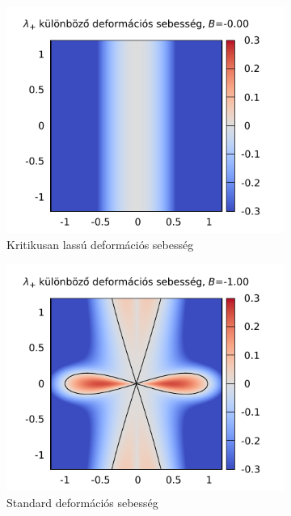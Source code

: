 \documentclass[10pt,a4paper]{scrartcl}
\begin{document}
\begin{figure}[htb]
\centering
\begin{subfigure}[t]{0.495\linewidth}
\centering\includegraphics[scale=0.95]{"figs/lambda_k_surface_B=0"}
\caption{Kritikusan lassú deformációs sebesség}
\end{subfigure}
\begin{subfigure}[t]{0.495\linewidth}
\centering\includegraphics[scale=0.95]{"figs/lambda_k_surface_B=-1"}
\caption{Standard deformációs sebesség}
\end{subfigure}
\begin{subfigure}[t]{0.495\linewidth}

\end{subfigure}
\end{figure}
\end{document}
